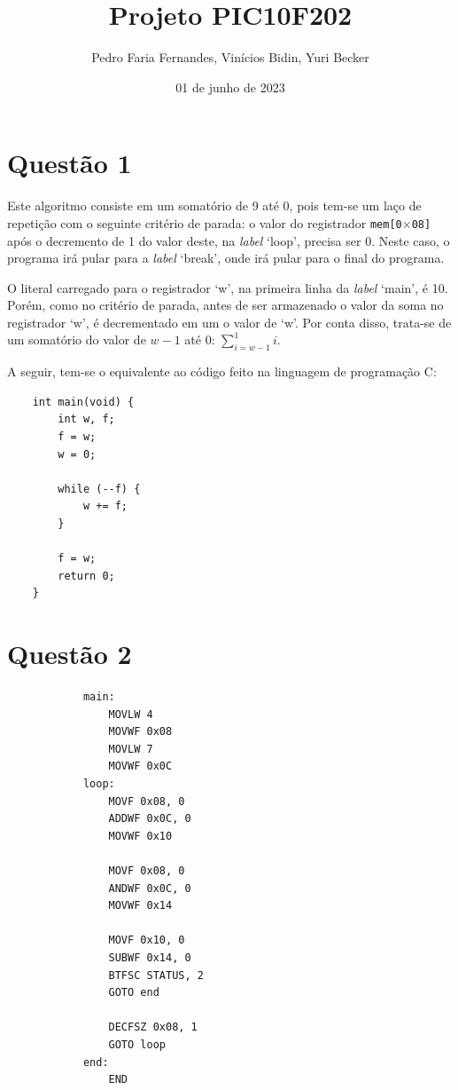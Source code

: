 \documentclass[12pt]{report}
\title{Projeto PIC10F202}
\author{Pedro Faria Fernandes, Vinícios Bidin, Yuri Becker}
\date{01 de junho de 2023}
\begin{document}
	\maketitle
	\section*{Questão 1}
		Este algoritmo consiste em um somatório de 9 até 0, pois tem-se um laço de repetição com o seguinte critério de parada: o valor do registrador \texttt{mem[0$\times$08]}
		após o decremento de 1 do valor deste, na \textit{label} `loop', precisa ser 0. Neste caso, o programa irá pular para a \textit{label} `break', onde irá pular para o final do programa.

		O literal carregado para o registrador `w', na primeira linha da \textit{label} `main', é 10. Porém, como no critério de parada, antes de ser armazenado o valor da soma no registrador `w', é decrementado em um o valor de `w'. Por conta disso, trata-se de um somatório do valor de $w - 1$ até 0: $\sum\limits_{i=w-1}^{1}i$.

		A seguir, tem-se o equivalente ao código feito na linguagem de programação C:\@
	\begin{verbatim}
	int main(void) {
		int w, f;
		f = w;
		w = 0;

		while (--f) {
			w += f;
		}

		f = w;
		return 0;
	}
	\end{verbatim}
	\clearpage
	\section*{Questão 2}
		\begin{verbatim}
			main:
			    MOVLW 4
			    MOVWF 0x08
			    MOVLW 7
			    MOVWF 0x0C
			loop:
			    MOVF 0x08, 0
			    ADDWF 0x0C, 0
			    MOVWF 0x10

			    MOVF 0x08, 0
			    ANDWF 0x0C, 0
			    MOVWF 0x14

			    MOVF 0x10, 0
			    SUBWF 0x14, 0
			    BTFSC STATUS, 2
			    GOTO end

			    DECFSZ 0x08, 1
			    GOTO loop
			end:
			    END
		\end{verbatim}
	\clearpage
\end{document}
